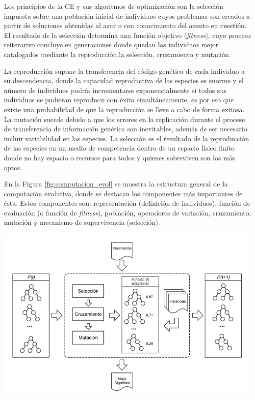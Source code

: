 Los principios de la CE y sus algoritmos de optimización son la selección impuesta sobre una población inicial de individuos cuyos problemas son creados a partir de soluciones obtenidas al azar o con conocimiento del asunto en cuestión. El resultado de la selección determina una función objetivo (\textit{fitness}), cuyo proceso reiterarivo concluye en generaciones donde quedan los individuos mejor catalogados mediante la reproducción,la selección, cruzamiento y mutación.

La reproducción supone la transferencia del código genético de cada individuo a su descendencia, donde la capacidad reproductiva de las especies es enorme y el número de individuos podría incrementarse exponencialmente si todos sus individuos se pudieran reproducir con éxito simultáneamente, es por eso que existe una probabilidad de que la reproducción se lleve a cabo de forma exitosa. La mutación sucede debido a que los errores en la replicación durante el proceso de transferencia de información genética son inevitables, además de ser necesario incluir variabilidad en las especies. La selección es el resultado de la reproducción de las especies en un medio de competencia dentro de un espacio físico finito donde no hay espacio o recursos para todos y quienes sobreviven son los más aptos.



En la Figura \ref{fig:computacion_evol} se muestra la estructura general de la computación evolutiva, donde se destacan los componentes más importantes de ésta. Estos componentes son: representación (definición de individuos), función de evaluación (o función de \textit{fitness}), población, operadores de variación, cruzamiento, mutación y mecanismo de supervivencia (selección).

\begingroup
    \centering
    \includegraphics[width=14cm]{images/cap2/computacion_evol2.png}
    \label{fig:computacion_evol}
\endgroup

